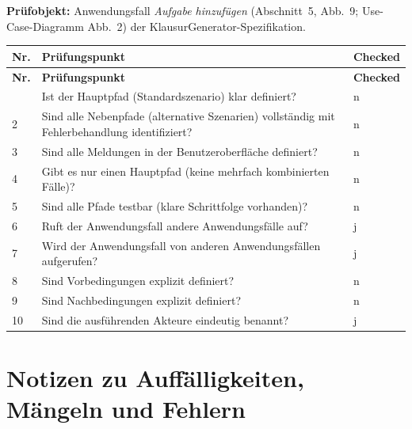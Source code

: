 \documentclass[
	fontsize=12pt,          %
	paper=a4,               %
	numbers=noenddot,       %
	listof=totoc,           %
	listof=entryprefix,     %
	listof=nochaptergap,    %
	bibliography=totoc,     %
	parskip=half,           %
	openany                 %
]{scrbook}
\begin{document}
\textbf{Prüfobjekt:} Anwendungsfall \emph{Aufgabe hinzufügen} (Abschnitt~5, Abb.~9; Use-Case-Diagramm Abb.~2) der KlausurGenerator-Spezifikation.

\begin{longtable}{| p{0.65cm} | p{10.9cm} | p{1.6cm} |}
	\hline
	\textbf{Nr.} & \textbf{Prüfungspunkt} & \textbf{Checked} \\ \hline
	\endfirsthead
	\hline
	\textbf{Nr.} & \textbf{Prüfungspunkt} & \textbf{Checked} \\ \hline
	\endhead
	\hline
	\endfoot
	1  & Ist der Hauptpfad (Standardszenario) klar definiert? & n \\ \hline
	2  & Sind alle Nebenpfade (alternative Szenarien) vollständig mit Fehlerbehandlung identifiziert? & n \\ \hline
	3  & Sind alle Meldungen in der Benutzeroberfläche definiert? & n \\ \hline
	4  & Gibt es nur einen Hauptpfad (keine mehrfach kombinierten Fälle)? & n \\ \hline
	5  & Sind alle Pfade testbar (klare Schrittfolge vorhanden)? & n \\ \hline
	6  & Ruft der Anwendungsfall andere Anwendungsfälle auf? & j \\ \hline
	7  & Wird der Anwendungsfall von anderen Anwendungsfällen aufgerufen? & j \\ \hline
	8  & Sind Vorbedingungen explizit definiert? & n \\ \hline
	9  & Sind Nachbedingungen explizit definiert? & n \\ \hline
	10 & Sind die ausführenden Akteure eindeutig benannt? & j \\ \hline
\end{longtable}

\section*{Notizen zu Auffälligkeiten, Mängeln und Fehlern}
\end{document}
